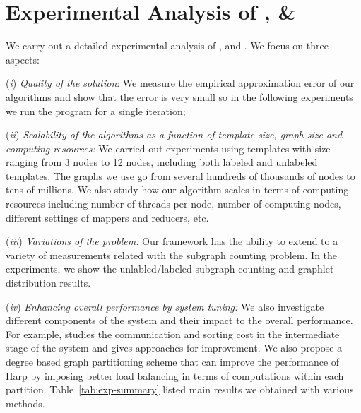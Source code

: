 \section{Experimental Analysis of \sahad{}, \ensahad{} \& \harpsahad{}}
\label{sec:experiment}

We carry out a detailed experimental analysis of  \sahad{}, \ensahad{} and
\harpsahad{}. We focus on three aspects:

({\it i}) \emph{Quality of the solution}:
We measure the empirical approximation error of our algorithms and show that the error is
very small so in the following experiments we run the program for a single
iteration;

({\it ii}) \emph{Scalability of the algorithms as a function of
template size, graph size and computing resources:}
We carried out experiments using templates with size ranging from 3 nodes to 12
nodes, including both labeled and unlabeled templates. The graphs we use go from
several hundreds of thousands of nodes to tens of millions. We also study how
our algorithm scales in terms of computing resources including number of threads
per node, number of computing nodes, different settings of mappers and reducers,
etc.

({\it iii}) \emph{Variations of the problem:}
Our framework has the ability to extend to a variety of measurements related
with the subgraph counting problem. In the experiments, we show the
unlabled/labeled subgraph counting and graphlet distribution results.

({\it iv}) \emph{Enhancing overall performance by system tuning:}
We also investigate different components of the system and their impact to the
overall performance. For example, \ensahad{} studies the communication and
sorting cost in the intermediate stage of the system and gives approaches for
improvement. We also propose a degree based graph partitioning scheme that can
improve the performance of Harp by imposing better load balancing in terms of
computations within each partition.  Table~\ref{tab:exp-summary} listed main
results we obtained with various methods.

\begin{table}[hptb]
	\caption{Comparison on \sahad{}, \ensahad{} and \harpsahad{}}
\label{tab:exp-summary}
\end{table}


